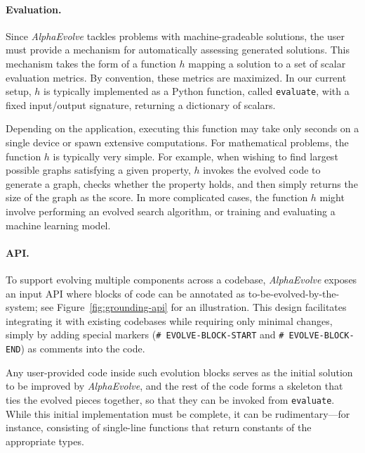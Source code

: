 \documentclass[logo,copyright,12pt]{googledeepmind}
\theoremstyle{definition}
\theoremstyle{remark}
\theoremstyle{plain}
\newcommand{\method}{\emph{AlphaEvolve}\xspace}
\begin{document}
\paragraph{Evaluation.} Since \method tackles problems with machine-gradeable solutions, the user must provide a mechanism for automatically assessing generated solutions.
This mechanism takes the form of a function $h$ mapping a solution to a set of scalar evaluation metrics.
By convention, these metrics are maximized.
In our current setup, $h$ is typically implemented as a Python function, called \texttt{evaluate}, with a fixed input/output signature, returning a dictionary of scalars.

Depending on the application, executing this function may take only seconds on a single device or spawn extensive computations. For mathematical problems, the function $h$ is typically very simple.
For example, when wishing to find largest possible graphs satisfying a given property, $h$ invokes the evolved code to generate a graph, checks whether the property holds, and then simply returns the size of the graph as the score.
In more complicated cases, the function $h$ might involve performing an evolved search algorithm, or training and evaluating a machine learning model.

\paragraph{API.} To support evolving multiple components across a codebase, \method exposes an input API where blocks of code can be annotated as to-be-evolved-by-the-system; see Figure~\ref{fig:grounding-api} for an illustration. This design facilitates integrating it with existing codebases while requiring only minimal changes, simply by adding special markers (\texttt{\# EVOLVE-BLOCK-START} and \texttt{\# EVOLVE-BLOCK-END}) as comments into the code.

Any user-provided code inside such evolution blocks serves as the initial solution to be improved by \method, and the rest of the code forms a skeleton that ties the evolved pieces together, so that they can be invoked from \texttt{evaluate}. 
While this initial implementation must be complete, it can be rudimentary---for instance, consisting of single-line functions that return constants of the appropriate types.
\end{document}
